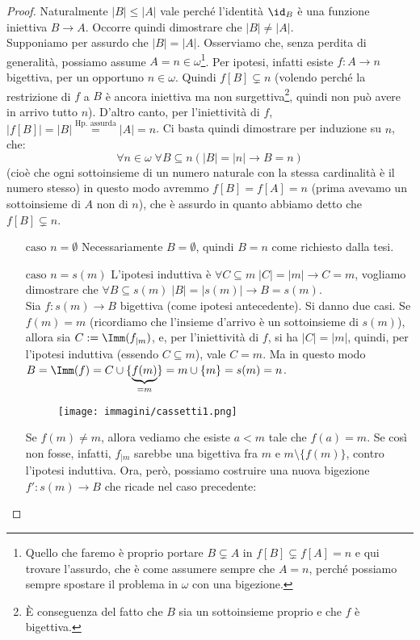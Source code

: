 \documentclass[11pt]{scrartcl}
\begin{document}
\begin{proof}
	Naturalmente $|B| \leq |A|$ vale perché l'identità $\id_B$ è una funzione iniettiva $B \rightarrow A$. Occorre quindi dimostrare che $|B| \ne |A|$.\\
	Supponiamo per assurdo che $|B| = |A|$. Osserviamo che, senza perdita di generalità, possiamo assume $A = n \in \omega$\footnote{Quello che faremo è proprio portare $B \subsetneq A$ in $f[B] \subsetneq f[A] = n$ e qui trovare l'assurdo, che è come assumere sempre che 
	$A = n$, perché possiamo sempre spostare il problema in $\omega$ con una bigezione.}. Per ipotesi, infatti esiste $f : A \rightarrow n$ bigettiva, per un opportuno $n \in \omega$.
	Quindi $f[B] \subsetneq n$ (volendo perché la restrizione di $f$ a $B$ è ancora iniettiva ma non surgettiva\footnote{È conseguenza del fatto che $B$ sia un sottoinsieme proprio e che $f$ è bigettiva.}, quindi non può
	avere in arrivo tutto $n$). D'altro canto, per l'iniettività di $f$, $|f[B]| = |B| \overset{\text{Hp. assurda}}{=} |A| = n$.
	Ci basta quindi dimostrare per induzione su $n$, che:
	\[ \forall n \in \omega \; \forall B \subseteq n (|B|=|n|\rightarrow B = n)
		\]
	(cioè che ogni sottoinsieme di un numero naturale con la stessa cardinalità è il numero stesso) in questo modo avremmo $f[B] = f[A] = n$ (prima avevamo un sottoinsieme di $A$ non di $n$), che è assurdo in quanto abbiamo detto che $f[B] \subsetneq n$.
	\begin{itemize}
		\item[$\boxed{\text{caso $n = \emptyset$}}$] Necessariamente $B = \emptyset$, quindi $B = n$ come richiesto dalla tesi.
		\item[$\boxed{\text{caso $n = s(m)$}}$] L'ipotesi induttiva è $\forall C \subseteq m \; |C| = |m| \rightarrow C = m$, vogliamo dimostrare che $\forall B \subseteq s(m) \; |B| = |s(m)| \rightarrow B = s(m)$.\\
		Sia $f : s(m) \rightarrow B$ bigettiva (come ipotesi antecedente). Si danno due casi. Se $f(m) = m$ (ricordiamo che l'insieme d'arrivo è un sottoinsieme di $s(m)$), allora sia $C := \Imm(f_{|m})$, e, per l'iniettività di $f$, si ha $|C| = |m|$, quindi, per l'ipotesi induttiva (essendo $C \subseteq m$), vale $C = m$. Ma in questo modo $B = \Imm(f) = C \cup \{\underbrace{f(m)}_{= m}\} = m \cup \{m\} = s(m) = n$.
		\begin{figure}[H]
			\centering
			\texttt{[image: immagini/cassetti1.png]}
		\end{figure}
		Se $f(m) \ne m$, allora vediamo che esiste $a < m$ tale che $f(a) = m$. Se così non fosse, infatti, $f_{|m}$ sarebbe una bigettiva fra $m$ e $m \setminus \{f(m)\}$, contro l'ipotesi induttiva. Ora, però, possiamo costruire una nuova bigezione $f' : s(m) \rightarrow B$ che ricade nel caso precedente:

\end{itemize}
\end{proof}
\end{document}
